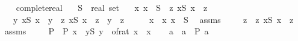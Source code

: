 \begin{isabellebody}
\ \ \isamarkupfalse%
%
\endisatagproof
{\isafoldproof}%
%
\isadelimproof
\isanewline
%
\endisadelimproof
\isanewline
{}\isamarkupfalse%
\ complete{\isacharunderscore}{\kern0pt}real{\isacharcolon}{\kern0pt}\isanewline
\ \ \ S\ {\isacharcolon}{\kern0pt}{\isacharcolon}{\kern0pt}\ {\isachardoublequoteopen}real\ set{\isachardoublequoteclose}\isanewline
\ \ \ {\isachardoublequoteopen}{\isasymexists}x{\isachardot}{\kern0pt}\ x\ {\isasymin}\ S{\isachardoublequoteclose}\ \ {\isachardoublequoteopen}{\isasymexists}z{\isachardot}{\kern0pt}\ {\isasymforall}x{\isasymin}S{\isachardot}{\kern0pt}\ x\ {\isasymle}\ z{\isachardoublequoteclose}\isanewline
\ \ \ {\isachardoublequoteopen}{\isasymexists}y{\isachardot}{\kern0pt}\ {\isacharparenleft}{\kern0pt}{\isasymforall}x{\isasymin}S{\isachardot}{\kern0pt}\ x\ {\isasymle}\ y{\isacharparenright}{\kern0pt}\ {\isasymand}\ {\isacharparenleft}{\kern0pt}{\isasymforall}z{\isachardot}{\kern0pt}\ {\isacharparenleft}{\kern0pt}{\isasymforall}x{\isasymin}S{\isachardot}{\kern0pt}\ x\ {\isasymle}\ z{\isacharparenright}{\kern0pt}\ {\isasymlongrightarrow}\ y\ {\isasymle}\ z{\isacharparenright}{\kern0pt}{\isachardoublequoteclose}\isanewline
%
\isadelimproof
%
\endisadelimproof
%
\isatagproof
{}\isamarkupfalse%
\ {\isacharminus}{\kern0pt}\isanewline
\ \ \isamarkupfalse%
\ x\ \ x{\isacharcolon}{\kern0pt}\ {\isachardoublequoteopen}x\ {\isasymin}\ S{\isachardoublequoteclose}\ \isamarkupfalse%
\ assms{\isacharparenleft}{\kern0pt}{}{\isacharparenright}{\kern0pt}\ \isacommand{{\isachardot}{\kern0pt}{\isachardot}{\kern0pt}}\isamarkupfalse%
\isanewline
\ \ \isamarkupfalse%
\ z\ \ z{\isacharcolon}{\kern0pt}\ {\isachardoublequoteopen}{\isasymforall}x{\isasymin}S{\isachardot}{\kern0pt}\ x\ {\isasymle}\ z{\isachardoublequoteclose}\ \isamarkupfalse%
\ assms{\isacharparenleft}{\kern0pt}{}{\isacharparenright}{\kern0pt}\ \isacommand{{\isachardot}{\kern0pt}{\isachardot}{\kern0pt}}\isamarkupfalse%
\isanewline
\isanewline
\ \ \isamarkupfalse%
\ P\ \ {\isachardoublequoteopen}P\ x\ {\isasymlongleftrightarrow}\ {\isacharparenleft}{\kern0pt}{\isasymforall}y{\isasymin}S{\isachardot}{\kern0pt}\ y\ {\isasymle}\ of{\isacharunderscore}{\kern0pt}rat\ x{\isacharparenright}{\kern0pt}{\isachardoublequoteclose}\ \ x\isanewline
\ \ \isamarkupfalse%
\ a\ \ a{\isacharcolon}{\kern0pt}\ {\isachardoublequoteopen}{\isasymnot}\ P\ a{\isachardoublequoteclose}\isanewline

\end{isabellebody}
